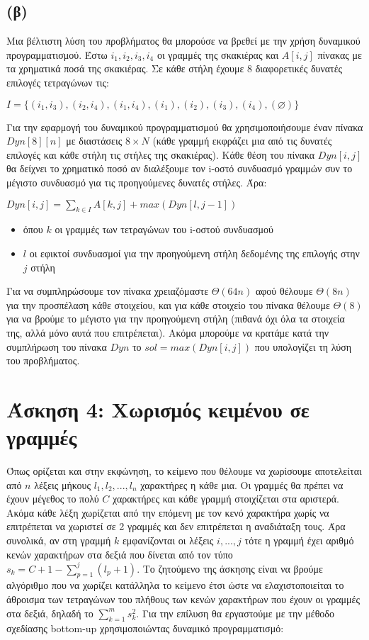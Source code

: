 \documentclass[a4paper,12pt]{report}
\begin{document}

\subsection*{(β)}
Μια βέλτιστη λύση του προβλήματος θα μπορούσε να βρεθεί με την χρήση δυναμικού προγραμματισμού. Έστω $i_1,i_2,i_3,i_4$ οι γραμμές της σκακιέρας και $A[i,j]$ πίνακας με τα χρηματικά ποσά της σκακιέρας. Σε κάθε στήλη έχουμε 8 διαφορετικές δυνατές επιλογές τετραγώνων τις: 
\begin{center}
$I=\{(i_1,i_3),(i_2,i_4),(i_1,i_4),(i_1),(i_2),(i_3),(i_4),(\varnothing)\}$
\end{center}
Για την εφαρμογή του δυναμικού προγραμματισμού θα χρησιμοποιήσουμε έναν πίνακα $Dyn[8][n]$ με διαστάσεις $8 \times N$ (κάθε γραμμή εκφράζει μια από τις δυνατές επιλογές και κάθε στήλη τις στήλες της σκακιέρας). Κάθε θέση του πίνακα $Dyn[i,j]$ θα δείχνει το χρηματικό ποσό αν διαλέξουμε τον i-οστό συνδυασμό γραμμών συν το μέγιστο συνδυασμό για τις προηγούμενες δυνατές στήλες. Άρα:
\begin{center}
 $Dyn[i,j]=\displaystyle\sum\limits_{k \in I}{}{A[k,j]} + max(Dyn[l,j-1])$ 
\begin{itemize}
 \item όπου $k$ οι γραμμές των τετραγώνων του i-οστού συνδυασμού
 \item $l$ οι εφικτοί συνδυασμοί για την προηγούμενη στήλη δεδομένης της επιλογής στην $j$ στήλη
\end{itemize}
\end{center}

Για να συμπληρώσουμε τον πίνακα χρειαζόμαστε $\Theta(64n)$ αφού θέλουμε $\Theta(8n)$ για την προσπέλαση κάθε στοιχείου, και για κάθε στοιχείο του πίνακα θέλουμε $\Theta(8)$ για να βρούμε το μέγιστο για την προηγούμενη στήλη (πιθανά όχι όλα τα στοιχεία της, αλλά μόνο αυτά που επιτρέπεται). Ακόμα μπορούμε να κρατάμε κατά την συμπλήρωση του πίνακα $Dyn$ το $sol=max(Dyn[i,j])$ που υπολογίζει τη λύση του προβλήματος.  

\section*{Άσκηση 4: Χωρισμός κειμένου σε γραμμές}
Όπως ορίζεται και στην εκφώνηση, το κείμενο που θέλουμε να χωρίσουμε αποτελείται από $n$ λέξεις μήκους $l_1,l_2,...,l_n$ χαρακτήρες η κάθε μια. Οι γραμμές θα πρέπει να έχουν μέγεθος το πολύ $C$ χαρακτήρες και κάθε γραμμή στοιχίζεται στα αριστερά. Ακόμα κάθε λέξη χωρίζεται από την επόμενη με τον κενό χαρακτήρα χωρίς να επιτρέπεται να χωριστεί σε 2 γραμμές και δεν επιτρέπεται η αναδιάταξη τους. Άρα συνολικά, αν στη γραμμή $k$ εμφανίζονται οι λέξεις $i,...,j$ τότε η γραμμή έχει αριθμό κενών χαρακτήρων στα δεξιά που δίνεται από τον τύπο $s_k=C+1-\sum_{p=1}^{j}{(l_p+1)}$. Το ζητούμενο της άσκησης είναι να βρούμε αλγόριθμο που να χωρίζει κατάλληλα το κείμενο έτσι ώστε να ελαχιστοποιείται το άθροισμα των τετραγώνων του πλήθους των κενών χαρακτήρων που έχουν οι γραμμές στα δεξιά, δηλαδή το $\sum_{k=1}^{m}{s_k^2}$. Για την επίλυση θα εργαστούμε με την μέθοδο σχεδίασης bottom-up χρησιμοποιώντας δυναμικό προγραμματισμό:
\end{document}
